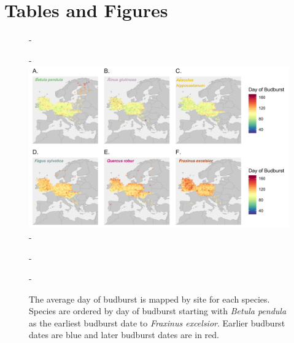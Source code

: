 \documentclass{article}\usepackage[]{graphicx}\usepackage[]{color}
\begin{document}
  
  
  
  
  

%




\section*{Tables and Figures} 

{\begin{figure} [H]
  -\begin{center}
  -\includegraphics[width=14cm]{..//figures/BB_dvr.png}
  -\caption{The average day of budburst is mapped by site for each species. Species are ordered by day of budburst starting with \textit{Betula pendula} as the earliest budburst date to \textit{Fraxinus excelsior}. Earlier budburst dates are blue and later budburst dates are in red. }\label{fig:bbmap}
  -\end{center}
  -\end{figure}}
  
\end{document}
